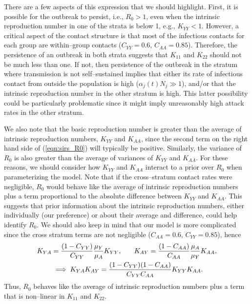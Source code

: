 There are a few aspects of this expression that we should highlight. First, it is possible for the outbreak to persist, i.e., $ R_0 > 1 $, even when the intrinsic reproduction number in one of the strata is below 1, e.g., $ K_{YY} <1$. However, a critical aspect of the contact structure is that most of the infectious contacts for each group are within--group contacts ($ C_{YY} = 0.6 $, $ C_{AA}=0.85 $). Therefore, the persistence of an outbreak in both strata suggests that $ K_{11} $ and $ K_{22} $ should not be much less than one. If not, then persistence of the outbreak in the stratum where transmission is not self--sustained implies that either its rate of infectious contact from outside the population is high ($ \alpha_j(t)N_j \gg  1$), and/or that the intrinsic reproduction number in the other stratum is high. This latter possibility could be particularly problematic since it might imply unreasonably high attack rates in the other stratum.

We also note that the basic reproduction number is greater than the average of intrinsic reproduction numbers, $ K_{YY} $ and $ K_{AA} $, since the second term on the right hand side of (\ref{eqn:sirs_R0}) will typically be positive. Similarly, the variance of $ R_0 $ is also greater than the average of variances of $ K_{YY} $ and $ K_{AA} $. For these reasons, we should consider how $ K_{YY} $ and $ K_{AA} $ interact to a prior over $ R_0 $ when parameterizing the model. Note that if the cross--stratum contact rates were negligible, $ R_0 $ would behave like the average of intrinsic reproduction numbers plus a term proportional to the absolute difference between $ K_{YY} $ and $ K_{AA} $. This suggests that prior information about the intrinsic reproduction numbers, either individually (our preference) or about their average and difference, could help identify $ R_0 $. We should also keep in mind that our model is more complicated since the cross stratum terms are not negligible ($ C_{AA} = 0.6 $, $ C_{YY}=0.85 $), hence
\begin{align*}
K_{YA} &= \frac{(1 - C_{YY})}{C_{YY}}\frac{\mu_Y}{\mu_A}K_{YY},\hspace{0.25in}
K_{AY} = \frac{(1 - C_{AA})}{C_{AA}}\frac{\mu_A}{\mu_Y}K_{AA},\\
&\implies K_{YA}K_{AY} = \frac{(1 - C_{YY})(1-C_{AA})}{C_{YY}C_{AA}}K_{YY}K_{AA}.
\end{align*} 
Thus, $ R_0 $ behaves like the average of intrinsic reproduction numbers plus a term that is non--linear in $ K_{11} $ and $ K_{22} $.

